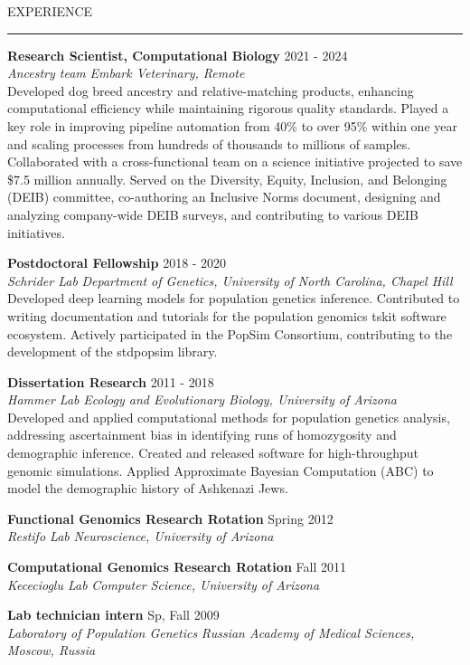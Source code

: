 \documentclass{resume} %
\renewenvironment{rSection}[1]{
\sectionskip
\textcolor{RoyalPurple}{\MakeUppercase{#1}}
\sectionlineskip
\hrule
\begin{list}{}{
\setlength{\leftmargin}{1.5em}
}
\item[]
}{
\end{list}
}
\begin{document}
\begin{rSection}{Experience}


{\bf Research Scientist, Computational Biology} \hfill  2021 - 2024\\ 
{\em Ancestry team} \hfill {\em Embark Veterinary, Remote}\\
Developed dog breed ancestry and relative-matching products, enhancing computational efficiency while maintaining rigorous quality standards. Played a key role in improving pipeline automation from 40\% to over 95\% within one year and scaling processes from hundreds of thousands to millions of samples. Collaborated with a cross-functional team on a science initiative projected to save \$7.5 million annually. Served on the Diversity, Equity, Inclusion, and Belonging (DEIB) committee, co-authoring an Inclusive Norms document, designing and analyzing company-wide DEIB surveys, and contributing to various DEIB initiatives.

{\bf Postdoctoral Fellowship} \hfill  2018 - 2020\\ 
{\em Schrider Lab} \hfill {\em Department of Genetics, University of North Carolina, Chapel Hill}\\
Developed deep learning models for population genetics inference. Contributed to writing documentation and tutorials for the population genomics tskit software ecosystem. Actively participated in the PopSim Consortium, contributing to the development of the stdpopsim library.


{\bf Dissertation Research} \hfill  2011 - 2018\\ 
{\em Hammer Lab} \hfill {\em Ecology and Evolutionary Biology, University of Arizona}\\
Developed and applied computational methods for population genetics analysis, addressing ascertainment bias in identifying runs of homozygosity and demographic inference. Created and released software for high-throughput genomic simulations. Applied Approximate Bayesian Computation (ABC) to model the demographic history of Ashkenazi Jews.

{\bf Functional Genomics Research Rotation} \hfill  Spring 2012\\ 
{\em Restifo Lab} \hfill {\em Neuroscience, University of Arizona}

{\bf Computational Genomics Research Rotation} \hfill  Fall 2011\\ 
{\em Kececioglu Lab} \hfill {\em Computer Science, University of Arizona}

{\bf Lab technician intern} \hfill  Sp, Fall 2009\\ 
{\em Laboratory of Population Genetics} \hfill {\em Russian Academy of Medical Sciences, Moscow, Russia}

\end{rSection}
\end{document}
